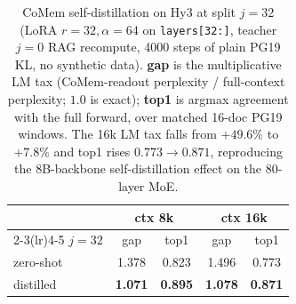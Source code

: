 \begin{table}[t]
\centering
\small
\begin{tabular}{@{}lcccc@{}}
\toprule
 & \multicolumn{2}{c}{ctx 8k} & \multicolumn{2}{c}{ctx 16k} \\
\cmidrule(lr){2-3}\cmidrule(lr){4-5}
\textbf{$j{=}32$} & gap & top1 & gap & top1 \\
\midrule
zero-shot  & 1.378 & 0.823 & 1.496 & 0.773 \\
distilled  & \textbf{1.071} & \textbf{0.895} & \textbf{1.078} & \textbf{0.871} \\
\bottomrule
\end{tabular}
\caption{CoMem self-distillation on Hy3 at split $j{=}32$ (LoRA $r{=}32,
\alpha{=}64$ on \texttt{layers[32:]}, teacher $j{=}0$ RAG recompute, 4000 steps of
plain PG19 KL, no synthetic data). \textbf{gap} is the multiplicative LM tax
(CoMem-readout perplexity / full-context perplexity; $1.0$ is exact); \textbf{top1}
is argmax agreement with the full forward, over matched 16-doc PG19 windows. The
16k LM tax falls from $+49.6\%$ to $+7.8\%$ and top1 rises $0.773\to0.871$,
reproducing the 8B-backbone self-distillation effect on the 80-layer MoE.}
\label{tab:hy3distill}
\end{table}

